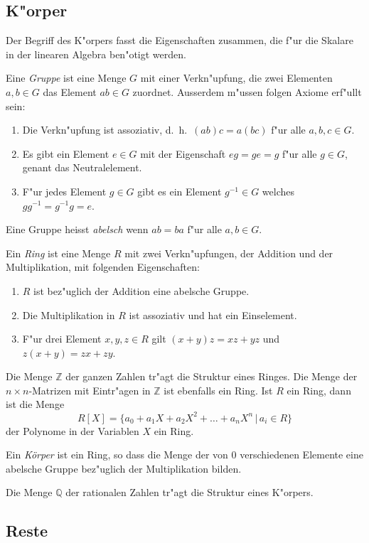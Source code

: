 \subsection{K"orper}
Der Begriff des K"orpers fasst die Eigenschaften zusammen, die f"ur
die Skalare in der linearen Algebra ben"otigt werden.

Eine {\em Gruppe} ist eine Menge $G$ mit einer Verkn"upfung, die zwei Elementen
$a,b\in G$ das Element $ab\in G$ zuordnet.
Ausserdem m"ussen folgen Axiome erf"ullt sein:
\begin{enumerate}[label={\bf G.\arabic*},itemsep=0mm]
\item
Die Verkn"upfung ist assoziativ, d.~h.~$(ab)c=a(bc)$ f"ur alle $a,b,c\in G$.
\item
Es gibt ein Element $e\in G$ mit der Eigenschaft $eg=ge=g$ f"ur alle $g\in G$,
genant das Neutralelement.
\item
F"ur jedes Element $g\in G$ gibt es ein Element $g^{-1}\in G$ welches
$gg^{-1}=g^{-1}g=e$.
\end{enumerate}
Eine Gruppe heisst {\em abelsch} wenn $ab=ba$ f"ur alle $a,b\in G$.

Ein {\em Ring} ist eine Menge $R$ mit zwei Verkn"upfungen, der Addition
und der Multiplikation, mit folgenden Eigenschaften:
\begin{enumerate}[label={\bf R.\arabic*},itemsep=0mm]
\item $R$ ist bez"uglich der Addition eine abelsche Gruppe.
\item Die Multiplikation in $R$ ist assoziativ und hat ein Einselement.
\item F"ur drei Element $x,y,z\in R$ gilt $(x+y)z=xz+yz$ und
$z(x+y)=zx+zy$.
\end{enumerate}

Die Menge $\mathbb Z$ der ganzen Zahlen tr"agt die Struktur eines Ringes.
Die Menge der $n\times n$-Matrizen mit Eintr"agen in $\mathbb Z$ ist ebenfalls
ein Ring.
Ist $R$ ein Ring, dann ist die Menge 
\[
R[X]=\{ a_0+a_1X +a_2X^2+\dots +a_nX^n\,|\,a_i\in R\}
\]
der Polynome in der Variablen $X$ ein Ring.

Ein {\em Körper} ist ein Ring, so dass die Menge der von $0$ verschiedenen
Elemente eine abelsche Gruppe bez"uglich der Multiplikation bilden.

Die Menge $\mathbb Q$ der rationalen Zahlen tr"agt die Struktur eines
K"orpers.

\subsection{Reste}

